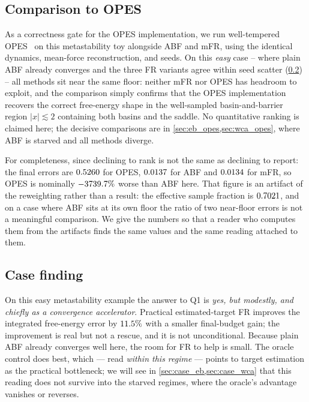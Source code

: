 \subsection{Comparison to OPES}
\label{sec:meta_opes}
As a correctness gate for the OPES implementation, we run well-tempered
OPES~\citep{invernizzi2020rethinking} on this metastability toy alongside ABF and
mFR, using the identical dynamics, mean-force reconstruction, and seeds. On this
\emph{easy} case -- where plain ABF already converges and the three FR variants
agree within seed scatter (\cref{sec:q1}) -- all methods sit near the same floor:
neither mFR nor OPES has headroom to exploit, and the comparison simply confirms
that the OPES implementation recovers the correct free-energy shape in the well-sampled
basin-and-barrier region $|x|\lesssim 2$ containing both basins and the saddle.
No quantitative ranking is claimed here; the decisive comparisons are in
\cref{sec:eb_opes,sec:wca_opes}, where ABF is starved and all methods diverge.

For completeness, since declining to rank is not the same as declining to report: the final
errors are $0.5260$ for OPES, $0.0137$ for ABF and $0.0134$ for
mFR, so OPES is nominally $-3739.7\%$ worse than ABF here. That figure is an artifact of
the reweighting rather than a result: the effective sample fraction is $0.7021$, and on a
case where ABF sits at its own floor the ratio of two near-floor errors is not a meaningful
comparison. We give the numbers so that a reader who computes them from the artifacts finds the
same values and the same reading attached to them.

\subsection{Case finding}
\label{sec:q1}
On this easy metastability example the answer to Q1 is \emph{yes, but modestly,
and chiefly as a convergence accelerator}. Practical estimated-target FR improves
the integrated free-energy error by $11.5\%$ with a smaller
final-budget gain; the improvement is real but not a rescue, and it is not
unconditional. Because plain ABF already converges well here, the room for FR to
help is small. The oracle control does best, which --- read \emph{within this
regime} --- points to target estimation as the practical bottleneck; we will see
in \cref{sec:case_eb,sec:case_wca} that this reading does not survive into the
starved regimes, where the oracle's advantage vanishes or reverses.
